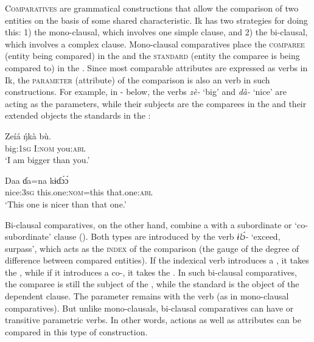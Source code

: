 \textsc{Comparatives} are grammatical constructions that allow the comparison of two entities on the basis of some shared characteristic. Ik has two strategies for doing this: 1) the mono-clausal, which involves one simple clause, and 2) the bi-clausal, which involves a complex clause. Mono-clausal comparatives place the \textsc{comparee} (entity being compared) in the  and the \textsc{standard} (entity the comparee is being compared to) in the . Since most comparable attributes are expressed as  verbs in Ik, the \textsc{parameter} (attribute) of the comparison is also an  verb in such constructions. For example, in - below, the  verbs \textit{zè-} ‘big’ and \textit{dà-} ‘nice’ are acting as the parameters, while their subjects are the comparees in the  and their extended objects the standards in the :




\ea\label{ex:syn:57}
\gll Zeíá     \'{ŋ}kà     bù. \\
big:\textsc{1sg}   I:\textsc{nom}   you:\textsc{abl}    \\
\glt ‘I am bigger than you.’ 
\z




\ea\label{ex:syn:58}
\gll Daa     ɗa=na       kɨɗ\'{ɔ}\'{ɔ} \\
nice:\textsc{3sg}   this.one:\textsc{nom}=this   that.one:\textsc{abl}    \\
\glt ‘This one is nicer than that one.’ 
\z


Bi-clausal comparatives, on the other hand, combine a  with a subordinate or ‘co-subordinate’ clause (). Both types are introduced by the verb \textit{ɨl\'{ɔ}-} ‘exceed, surpass’, which acts as the \textsc{index} of the comparison (the gauge of the degree of difference between compared entities). If the indexical verb introduces a , it takes the , while if it introduces a co-, it takes the . In such bi-clausal comparatives, the comparee is still the subject of the , while the standard is the object of the dependent clause. The parameter remains with the  verb (as in mono-clausal comparatives). But unlike mono-clausals, bi-clausal comparatives can have  or transitive parametric verbs. In other words, actions as well as attributes can be compared in this type of construction.

